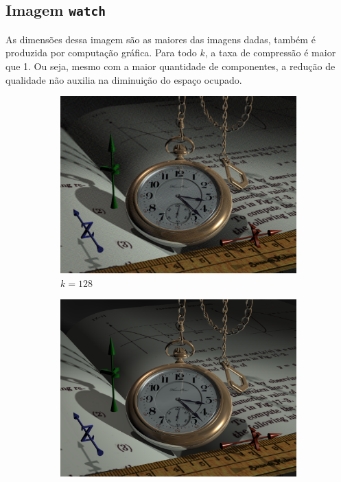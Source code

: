 \documentclass[brazilian,a4paper,twocolumn]{article}
\begin{document}
    \subsection{Imagem \texttt{watch}}

        As dimensões dessa imagem são as maiores das imagens dadas, também é  produzida por computação gráfica. Para todo $k$, a taxa de compressão é maior que 1. Ou seja, mesmo com a maior quantidade de componentes, a redução de qualidade não auxilia na diminuição do espaço ocupado.

        \begin{figure}[h]
            \centering
            \begin{subfigure}{0.27\textwidth}
                \includegraphics[width=\textwidth,keepaspectratio]{watch-128}
                \caption{$k=128$}
                \label{fig:watch-128}
            \end{subfigure}
            \begin{subfigure}{0.27\textwidth}
                \includegraphics[width=\textwidth,keepaspectratio]{watch}

\end{subfigure}
\end{figure}
\end{document}
